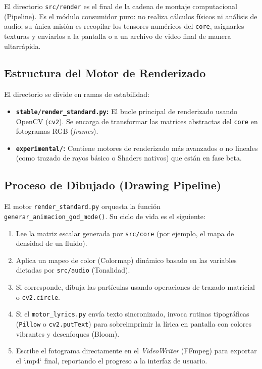 \documentclass[12pt]{book}
\begin{document}
El directorio \texttt{src/render} es el final de la cadena de montaje computacional (Pipeline). Es el módulo consumidor puro: no realiza cálculos físicos ni análisis de audio; su única misión es recopilar los tensores numéricos del \texttt{core}, asignarles texturas y enviarlos a la pantalla o a un archivo de video final de manera ultarrápida.

\subsection{Estructura del Motor de Renderizado}
El directorio se divide en ramas de estabilidad:
\begin{itemize}
    \item \textbf{\texttt{stable/render\_standard.py}:} El bucle principal de renderizado usando OpenCV (\texttt{cv2}). Se encarga de transformar las matrices abstractas del \texttt{core} en fotogramas RGB (\textit{frames}).
    \item \textbf{\texttt{experimental/}:} Contiene motores de renderizado más avanzados o no lineales (como trazado de rayos básico o Shaders nativos) que están en fase beta.
\end{itemize}

\subsection{Proceso de Dibujado (Drawing Pipeline)}
El motor \texttt{render\_standard.py} orquesta la función \texttt{generar\_animacion\_god\_mode()}. Su ciclo de vida es el siguiente:
\begin{enumerate}
    \item Lee la matriz escalar generada por \texttt{src/core} (por ejemplo, el mapa de densidad de un fluido).
    \item Aplica un mapeo de color (Colormap) dinámico basado en las variables dictadas por \texttt{src/audio} (Tonalidad).
    \item Si corresponde, dibuja las partículas usando operaciones de trazado matricial o \texttt{cv2.circle}.
    \item Si el \texttt{motor\_lyrics.py} envía texto sincronizado, invoca rutinas tipográficas (\texttt{Pillow} o \texttt{cv2.putText}) para sobreimprimir la lírica en pantalla con colores vibrantes y desenfoques (Bloom).
    \item Escribe el fotograma directamente en el \textit{VideoWriter} (FFmpeg) para exportar el `.mp4` final, reportando el progreso a la interfaz de usuario.
\end{enumerate}
\end{document}

